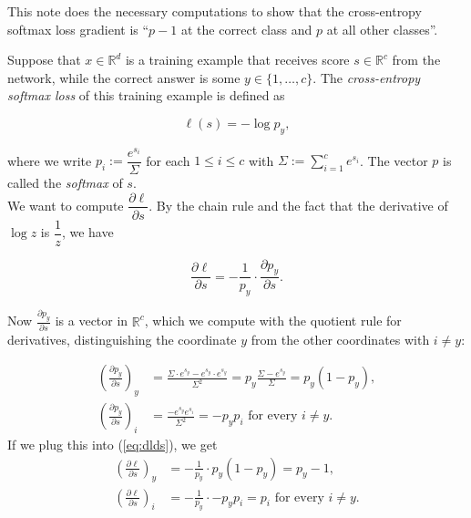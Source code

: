 \documentclass{article}
\begin{document}
This note does the necessary computations to show that the cross-entropy softmax loss gradient is ``$p - 1$ at the correct class and $p$ at all other classes''.

Suppose that $x \in \mathbb R^d$ is a training example that receives score $s \in \mathbb R^c$ from the network, while the correct answer is some $y \in \{1, \dots, c\}$. %
The \emph{cross-entropy softmax loss} of this training example is defined as

\[\ell(s) = -\log p_y,\]

where we write $p_i := \dfrac{e^{s_i}}{\Sigma}$ for each $1 \leq i \leq c$ with $\Sigma := \sum_{i=1}^c e^{s_i}$. The vector $p$ is called the \emph{softmax} of $s$. \\

We want to compute $\dfrac{\partial \ell}{\partial s}$. By the chain rule and the fact that the derivative of $\log z$ is $\dfrac{1}{z}$, we have

\begin{equation}\label{eq:dlds}
  \frac{\partial \ell}{\partial s} = - \frac{1}{p_y} \cdot \frac{\partial p_y}{\partial s}.
  \end{equation}

Now $\frac{\partial p_y}{\partial s}$ is a vector in $\mathbb R^c$, which we compute with the quotient rule for derivatives, distinguishing the coordinate $y$ from the other coordinates with $i \neq y$:

\begin{align*} \left(\frac{\partial p_y}{\partial s}\right)_y &= \frac{\Sigma \cdot e^{s_y}  - e^{s_y} \cdot e^{s_y}}{\Sigma^2} = p_y \frac{\Sigma - e^{s_y}}{\Sigma} = p_y(1-p_y),\\
  \left(\frac{\partial p_y}{\partial s}\right)_i &= \frac{-e^{s_y} e^{s_i}}{\Sigma^2} = -p_y p_i \text{ for every } i \neq y.
\end{align*}                                                   
If we plug this into (\ref{eq:dlds}), we get
\begin{align*}
  \left(\frac{\partial \ell}{\partial s}\right)_y &= -\frac{1}{p_y} \cdot p_y (1 - p_y) = p_y - 1,\\
  \left(\frac{\partial \ell}{\partial s}\right)_i &= -\frac{1}{p_y} \cdot - p_y p_i = p_i \text{ for every } i \neq y.
\end{align*}                                                                              
\end{document}
